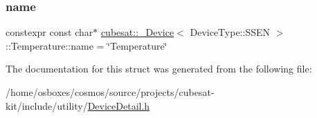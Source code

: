 \subsubsection{\texorpdfstring{name}{name}}
{\footnotesize\ttfamily constexpr const char$\ast$ \hyperlink{structcubesat_1_1__Device}{cubesat\+::\+\_\+\+Device}$<$ Device\+Type\+::\+S\+S\+EN $>$\+::Temperature\+::name = \char`\"{}Temperature\char`\"{}\hspace{0.3cm}{\ttfamily [static]}}



The documentation for this struct was generated from the following file\+:\begin{DoxyCompactItemize}
\item 
/home/osboxes/cosmos/source/projects/cubesat-\/kit/include/utility/\hyperlink{DeviceDetail_8h}{Device\+Detail.\+h}\end{DoxyCompactItemize}
